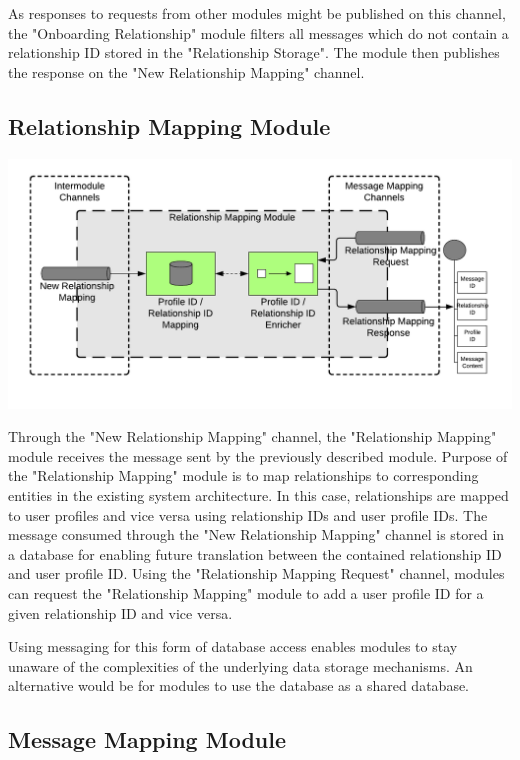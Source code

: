 As responses to requests from other modules might be published on this channel, the "Onboarding Relationship" module filters all messages which do not contain a relationship ID stored in the "Relationship Storage". The module then publishes the response on the "New Relationship Mapping" channel.

\subsection{Relationship Mapping Module}

\begin{center}
    \includegraphics[scale=0.6]{Diagrams/Integration Architecture 1/Technological Integration/9. Relationship Mapping.pdf}
\end{center}

Through the "New Relationship Mapping" channel, the "Relationship Mapping" module receives the message sent by the previously described module. Purpose of the "Relationship Mapping" module is to map relationships to corresponding entities in the existing system architecture. In this case, relationships are mapped to user profiles and vice versa using relationship IDs and user profile IDs. The message consumed through the "New Relationship Mapping" channel is stored in a database for enabling future translation between the contained relationship ID and user profile ID. Using the "Relationship Mapping Request" channel, modules can request the "Relationship Mapping" module to add a user profile ID for a given relationship ID and vice versa.

Using messaging for this form of database access enables modules to stay unaware of the complexities of the underlying data storage mechanisms. An alternative would be for modules to use the database as a shared database.

\subsection{Message Mapping Module}

